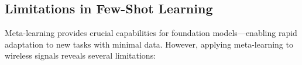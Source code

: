 



\subsection{Limitations in Few-Shot Learning}

Meta-learning provides crucial capabilities for foundation models—enabling rapid adaptation to new tasks with minimal data. However, applying meta-learning to wireless signals reveals several limitations:

